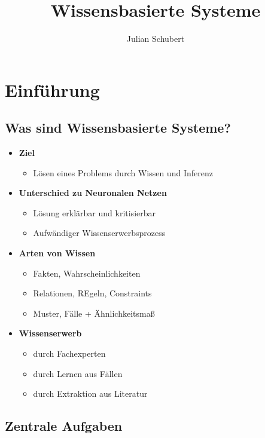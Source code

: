 \documentclass[14pt]{article}
\title{Wissensbasierte Systeme}
\author{Julian Schubert}
\begin{document}
    \maketitle
    \tableofcontents

    \newpage

    \section{Einführung}
    \subsection{Was sind Wissensbasierte Systeme?}
        \begin{itemize}
            \item \textbf{Ziel}
            \begin{itemize}
                \item Lösen eines Problems durch Wissen und Inferenz
            \end{itemize}
            \item \textbf{Unterschied zu Neuronalen Netzen}
            \begin{itemize}
                \item Lösung erklärbar und kritisierbar
                \item Aufwändiger Wissenserwerbsprozess
            \end{itemize}
            \item \textbf{Arten von Wissen}
            \begin{itemize}
                \item Fakten, Wahrscheinlichkeiten
                \item Relationen, REgeln, Constraints
                \item Muster, Fälle + Ähnlichkeitsmaß
            \end{itemize}
            \item \textbf{Wissenserwerb}
            \begin{itemize}
                \item durch Fachexperten
                \item durch Lernen aus Fällen
                \item durch Extraktion aus Literatur
            \end{itemize}
        \end{itemize}

    \subsection{Zentrale Aufgaben}
\end{document}
